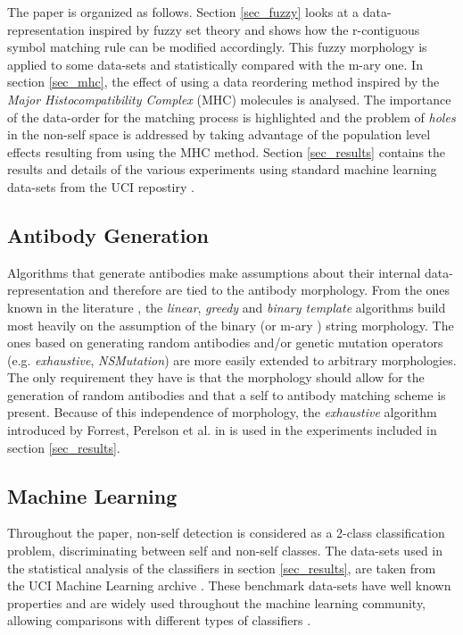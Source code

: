 \documentclass{llncs}
\begin{document}
The paper is organized as follows.
Section \ref{sec_fuzzy} looks at a data-representation inspired by fuzzy set theory and shows how the r-contiguous symbol matching rule can be modified accordingly.
This fuzzy morphology is applied to some data-sets and statistically compared with the m-ary one.
In section \ref{sec_mhc}, the effect of using a data reordering method inspired by the {\it Major Histocompatibility Complex} (MHC) molecules is analysed.
The importance of the data-order for the matching process is highlighted and the problem of {\it holes} in the non-self space is addressed by taking advantage of the population level effects resulting from using the MHC method.
Section \ref{sec_results} contains the results and details of the various experiments using standard machine learning data-sets from the UCI repostiry \cite{uci}.

\subsection{Antibody Generation}
Algorithms that generate antibodies make assumptions about their internal data-representation and therefore are tied to the antibody morphology.
From the ones known in the literature \cite{araya}, the {\it linear}, {\it greedy} and {\it binary template} algorithms build most heavily on the assumption of the binary (or m-ary \cite{singh}) string morphology.
The ones based on generating random antibodies and/or genetic mutation operators (e.g. {\it exhaustive}, {\it NSMutation}) are more easily extended to arbitrary morphologies.
The only requirement they have is that the morphology should allow for the generation of random antibodies and that a self to antibody matching scheme is present.
Because of this independence of morphology, the {\it exhaustive} algorithm introduced by Forrest, Perelson et al. in \cite{forrest} is used in the experiments included in section \ref{sec_results}.

\subsection{Machine Learning}
Throughout the paper, non-self detection is considered as a 2-class classification problem, discriminating between self and non-self classes.
The data-sets used in the statistical analysis of the classifiers in section \ref{sec_results}, are taken from the UCI Machine Learning archive \cite{uci}.
These benchmark data-sets have well known properties and are widely used throughout the machine learning community, allowing comparisons with different types of classifiers \cite{uci_case}.
\end{document}
